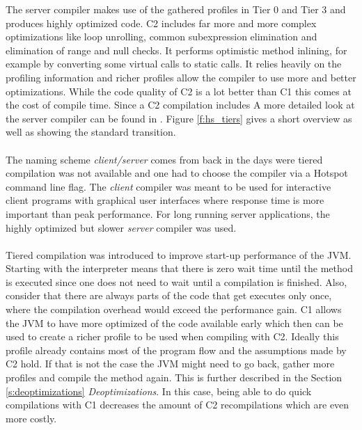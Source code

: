 The server compiler makes use of the gathered profiles in Tier 0 and Tier 3 and produces highly optimized code. C2 includes far more and more complex optimizations like loop unrolling, common subexpression elimination and elimination of range and null checks. It performs optimistic method inlining, for example by converting some virtual calls to static calls. It relies heavily on the profiling information and richer profiles allow the compiler to use more and better optimizations.
While the code quality of C2 is a lot better than C1 this comes at the cost of compile time. Since a C2 compilation includes 
A more detailed look at the server compiler can be found in \cite{server_compiler}.
Figure \ref{f:hs_tiers} gives a short overview as well as showing the standard transition.
\\\\
The naming scheme \textit{client/server} comes from back in the days were tiered compilation was not available and one had to choose the compiler via a Hotspot command line flag. The \textit{client} compiler was meant to be used for interactive client programs with graphical user interfaces where response time is more important than peak performance. For long running server applications, the highly optimized but slower \textit{server} compiler was used. 
\\\\
Tiered compilation was introduced to improve start-up performance of the JVM.
Starting with the interpreter means that there is zero wait time until the method is executed since one does not need to wait until a compilation is finished. Also, consider that there are always parts of the code that get executes only once, where the compilation overhead would exceed the performance gain. C1 allows the JVM to have more optimized of the code available early which then can be used to create a richer profile to be used when compiling with C2. Ideally this profile already contains most of the program flow and the assumptions made by C2 hold. If that is not the case the JVM might need to go back, gather more profiles and compile the method again. This is further described in the Section \ref{s:deoptimizations} \textit{Deoptimizations}. In this case, being able to do quick compilations with C1 decreases the amount of C2 recompilations which are even more costly.

